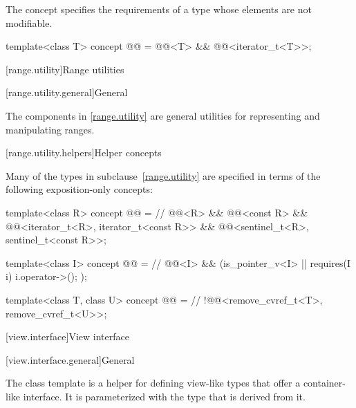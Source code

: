 \pnum
The  concept specifies the requirements of a
 type whose elements are not modifiable.

\begin{itemdecl}
template<class T>
  concept @@ =
    @@<T> && @@<iterator_t<T>>;
\end{itemdecl}

[range.utility]{Range utilities}

[range.utility.general]{General}

\pnum
The components in \ref{range.utility} are general utilities for representing and
manipulating ranges.

[range.utility.helpers]{Helper concepts}

\pnum
Many of the types in subclause~\ref{range.utility} are specified in terms of
the following exposition-only concepts:

\begin{codeblock}
template<class R>
  concept @@ =                                     // \expos
    @@<R> && @@<const R> &&
    @@<iterator_t<R>, iterator_t<const R>> &&
    @@<sentinel_t<R>, sentinel_t<const R>>;

template<class I>
  concept @@ =                                       // \expos
    @@<I> && (is_pointer_v<I> || requires(I i) { i.operator->(); });

template<class T, class U>
  concept @@ =                                  // \expos
    !@@<remove_cvref_t<T>, remove_cvref_t<U>>;
\end{codeblock}

[view.interface]{View interface}

[view.interface.general]{General}

\pnum
The class template  is a helper for defining
view-like types that offer a container-like interface. It is
parameterized with the type that is derived from it.

